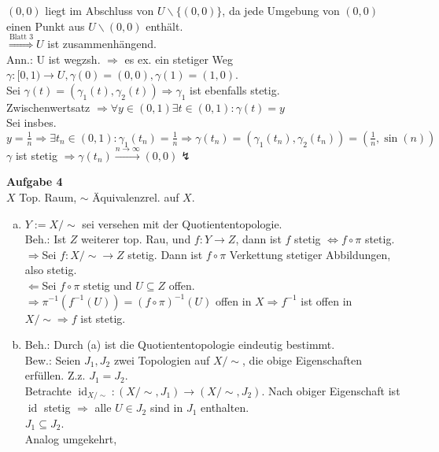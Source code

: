 \documentclass{article}
\DeclareMathOperator{\id}{id}
\begin{document}
\begin{enumerate}[(a)]
$(0,0)$ liegt im Abschluss von $U\backslash\{(0,0)\}$, da jede Umgebung von $(0,0)$ einen Punkt aus $U\backslash(0,0)$ enthält.\\
$\stackrel{\text{Blatt 3}}{\Rightarrow}U$ ist zusammenhängend.\\
Ann.: U ist wegzsh. $\Rightarrow$ es ex. ein stetiger Weg $\gamma:[0,1)\rightarrow U,\gamma(0)=(0,0),\gamma(1)=(1,0)$.\\
Sei $\gamma(t)=(\gamma_1(t),\gamma_2(t))\Rightarrow\gamma_1$ ist ebenfalls stetig.\\
Zwischenwertsatz $\Rightarrow\forall y\in(0,1)\exists t\in(0,1):\gamma(t)=y$\\
Sei insbes. $y=\frac{1}{n}\Rightarrow\exists t_n\in (0,1): \gamma_1(t_n)=\frac{1}{n}\Rightarrow\gamma(t_n)=(\gamma_1(t_n),\gamma_2(t_n))=(\frac{1}{n},\sin(n))$\\
$\gamma$ ist stetig $\Rightarrow\gamma(t_n)\stackrel{n\rightarrow\infty}{\longrightarrow}(0,0)\lightning$
\end{enumerate}

\textbf{Aufgabe 4}\\
$X$ Top. Raum, $\sim$ Äquivalenzrel. auf $X$.\begin{enumerate}[(a)]
\item $Y:=X/\sim$ sei versehen mit der Quotiententopologie.\\
Beh.: Ist $Z$ weiterer top. Rau, und $f: Y\rightarrow Z$, dann ist $f$ stetig $\Leftrightarrow f\circ\pi$ stetig.
\glqq$\Rightarrow$\grqq Sei $f:X/\sim\rightarrow Z$ stetig. Dann ist $f\circ\pi$ Verkettung stetiger Abbildungen, also stetig.\\
\glqq$\Leftarrow$\grqq Sei $f\circ\pi$ stetig und $U\subseteq Z$ offen.\\
$\Rightarrow\pi^{-1}(f^{-1}(U)) = (f\circ\pi)^{-1}(U)$ offen in $X \Rightarrow f^{-1}$ ist offen in $X/\sim\Rightarrow f$ ist stetig.
\item Beh.: Durch (a) ist die Quotiententopologie eindeutig bestimmt.\\
Bew.: Seien $J_1,J_2$ zwei Topologien auf $X/\sim$, die obige Eigenschaften erfüllen. Z.z. $J_1=J_2$.\\
Betrachte $\id_{X/\sim}:(X/\sim,J_1)\rightarrow(X/\sim,J_2)$. Nach obiger Eigenschaft ist $\id$ stetig $\Rightarrow$ alle $U\in J_2$ sind in $J_1$ enthalten.\\
$J_1\subseteq J_2$.\\
Analog umgekehrt,

\end{enumerate}
\end{document}
